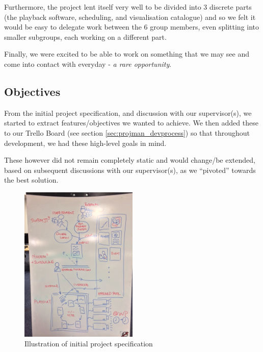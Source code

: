 \documentclass[a4paper, titlepage]{article}
\begin{document}
Furthermore, the project lent itself very well to be divided into 3 discrete parts (the playback software, scheduling, and visualisation catalogue) and so we felt it would be easy to delegate work between the 6 group members, even splitting into smaller subgroups, each working on a different part.

Finally, we were excited to be able to work on something that we may see and come into contact with everyday - \textit{a rare opportunity}.

\subsection{Objectives} \label{sec:intro_objectives}

From the initial project specification, and discussion with our supervisor(s), we started to extract features/objectives we wanted to achieve. We then added these to our Trello Board (see section \ref{sec:projman_devprocess}) so that throughout development, we had these high-level goals in mind. 

These however did not remain completely static and would change/be extended, based on subsequent discussions with our supervisor(s), as we ``pivoted'' towards the best solution.

\begin{figure}[h!]
  \centering
    \includegraphics[width = 0.5\textwidth, trim = 0 0.5cm 0 1.2cm, clip]{./intro/userreq.jpg}
  \caption{Illustration of initial project specification}
  \label{fig:intro_userreq}
\end{figure}
\end{document}
